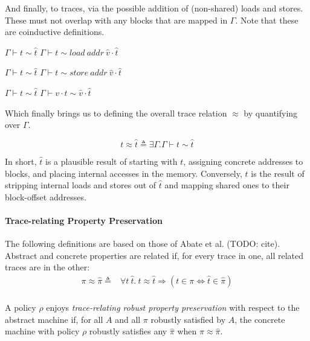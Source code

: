 \documentclass{article}
\begin{document}
And finally, to traces, via the possible addition of (non-shared) loads and stores. These must
not overlap with any blocks that are mapped in \(\Gamma\). Note that these are coinductive
definitions.

            {\(\Gamma \vdash t \sim \hat{t}\)}
            {\(\Gamma \vdash t \sim \mathit{load} ~ \mathit{addr} ~ \hat{v} \cdot \hat{t}\)}

            {\(\Gamma \vdash t \sim \hat{t}\)}
            {\(\Gamma \vdash t \sim \mathit{store} ~ \mathit{addr} ~ \hat{v} \cdot \hat{t}\)}

            {\(\Gamma \vdash t \sim \hat{t}\)}
            {\(\Gamma \vdash v \cdot t \sim \hat{v} \cdot \hat{t}\)}

Which finally brings us to defining the overall trace relation \(\approx\)
by quantifying over \(\Gamma\).

\[t \approx \hat{t} \triangleq \exists \Gamma . \Gamma \vdash t \sim \hat{t}\]

In short, \(\hat{t}\) is a plausible result of starting with \(t\), assigning concrete
addresses to blocks, and placing internal accesses in the memory. Conversely, \(t\) is
the result of stripping internal loads and stores out of \(\hat{t}\) and mapping shared
ones to their block-offset addresses.

\paragraph{Trace-relating Property Preservation}

The following definitions are based on those of Abate et al. (TODO: cite).
Abstract and concrete properties are related if, for every trace in one, all related traces are
in the other:
\[\begin{split}
\pi \approx \hat{\pi} \triangleq
& \forall t ~ \hat{t} . ~ t \approx \hat{t} \Rightarrow (t \in \pi \Leftrightarrow \hat{t} \in \hat{\pi}) \\
\end{split}\]

A policy \(\rho\) enjoys {\em trace-relating robust property preservation} with respect to the
abstract machine if, for all \(A\) and all \(\pi\) robustly satisfied by \(A\), the concrete
machine with policy \(\rho\) robustly satisfies any \(\hat{\pi}\) when \(\pi \approx \hat{\pi}\).
\end{document}
